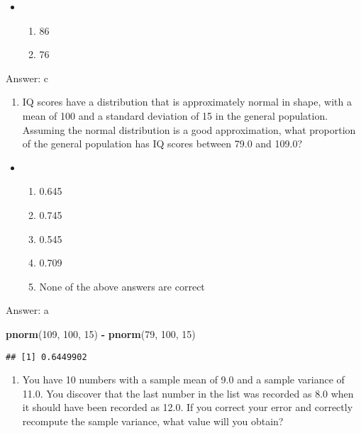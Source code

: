 \documentclass[]{article}
\newenvironment{Shaded}{\begin{snugshade}}{\end{snugshade}}
\newcommand{\KeywordTok}[1]{\textcolor[rgb]{0.13,0.29,0.53}{\textbf{#1}}}
\newcommand{\DecValTok}[1]{\textcolor[rgb]{0.00,0.00,0.81}{#1}}
\newcommand{\StringTok}[1]{\textcolor[rgb]{0.31,0.60,0.02}{#1}}
\newcommand{\OperatorTok}[1]{\textcolor[rgb]{0.81,0.36,0.00}{\textbf{#1}}}
\newcommand{\NormalTok}[1]{#1}
\providecommand{\tightlist}{%
  \setlength{\itemsep}{0pt}\setlength{\parskip}{0pt}}
\begin{document}
\begin{itemize}
\item
  \begin{enumerate}
  \def\labelenumi{\alph{enumi}.}
  \setcounter{enumi}{2}
  \tightlist
  \item
    86
  \item
    76
  \end{enumerate}
\end{itemize}

Answer: c

\begin{enumerate}
\def\labelenumi{\arabic{enumi}.}
\setcounter{enumi}{3}
\tightlist
\item
  IQ scores have a distribution that is approximately normal in shape,
  with a mean of 100 and a standard deviation of 15 in the general
  population. Assuming the normal distribution is a good approximation,
  what proportion of the general population has IQ scores between 79.0
  and 109.0?
\end{enumerate}

\begin{itemize}
\item
  \begin{enumerate}
  \def\labelenumi{\alph{enumi}.}
  \item
    0.645
  \item
    0.745
  \item
    0.545
  \item
    0.709
  \item
    None of the above answers are correct
  \end{enumerate}
\end{itemize}

Answer: a

\begin{Shaded}
\begin{Highlighting}[]
\KeywordTok{pnorm}\NormalTok{(}\DecValTok{109}\NormalTok{, }\DecValTok{100}\NormalTok{, }\DecValTok{15}\NormalTok{) }\OperatorTok{-}\StringTok{ }\KeywordTok{pnorm}\NormalTok{(}\DecValTok{79}\NormalTok{, }\DecValTok{100}\NormalTok{, }\DecValTok{15}\NormalTok{)}
\end{Highlighting}
\end{Shaded}

\begin{verbatim}
## [1] 0.6449902
\end{verbatim}

\begin{enumerate}
\def\labelenumi{\arabic{enumi}.}
\setcounter{enumi}{4}
\tightlist
\item
  You have 10 numbers with a sample mean of 9.0 and a sample variance of
  11.0. You discover that the last number in the list was recorded as
  8.0 when it should have been recorded as 12.0. If you correct your
  error and correctly recompute the sample variance, what value will you
  obtain?
\end{enumerate}
\end{document}
